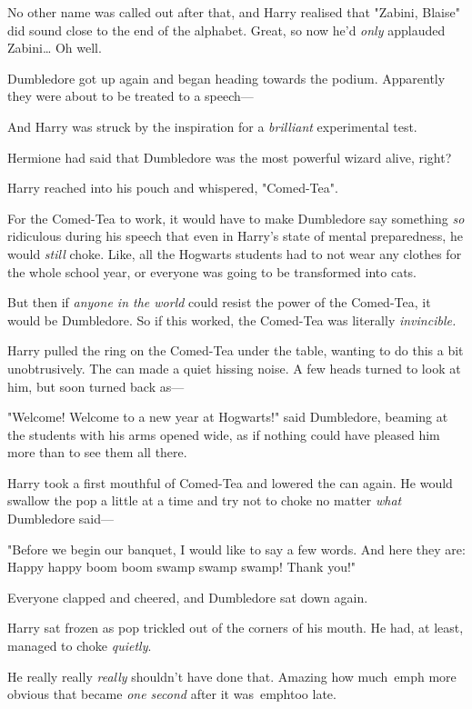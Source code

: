 No other name was called out after that, and Harry realised that "Zabini, 
Blaise" did sound close to the end of the alphabet. Great, so now he'd 
\emph{only} applauded Zabini{\ldots} Oh well.

Dumbledore got up again and began heading towards the podium. Apparently they 
were about to be treated to a speech---

And Harry was struck by the inspiration for a \emph{brilliant} experimental 
test.

Hermione had said that Dumbledore was the most powerful wizard alive, right?

Harry reached into his pouch and whispered, "Comed-Tea".

For the Comed-Tea to work, it would have to make Dumbledore say something 
\emph{so} ridiculous during his speech that even in Harry's state of mental 
preparedness, he would \emph{still} choke. Like, all the Hogwarts students had 
to not wear any clothes for the whole school year, or everyone was going to be 
transformed into cats.

But then if \emph{anyone in the world} could resist the power of the Comed-Tea, 
it would be Dumbledore. So if this worked, the Comed-Tea was literally 
\emph{invincible.}

Harry pulled the ring on the Comed-Tea under the table, wanting to do this a 
bit unobtrusively. The can made a quiet hissing noise. A few heads turned to 
look at him, but soon turned back as---

"Welcome! Welcome to a new year at Hogwarts!" said Dumbledore, beaming at the 
students with his arms opened wide, as if nothing could have pleased him more 
than to see them all there.

Harry took a first mouthful of Comed-Tea and lowered the can again. He would 
swallow the pop a little at a time and try not to choke no matter \emph{what} 
Dumbledore said---

"Before we begin our banquet, I would like to say a few words. And here they 
are: Happy happy boom boom swamp swamp swamp! Thank you!"

Everyone clapped and cheered, and Dumbledore sat down again.

Harry sat frozen as pop trickled out of the corners of his mouth. He had, at 
least, managed to choke \emph{quietly}.

He really really \emph{really} shouldn't have done that. Amazing how much\ emph{
more obvious} that became \emph{one second} after it was\ emph{too late}.

